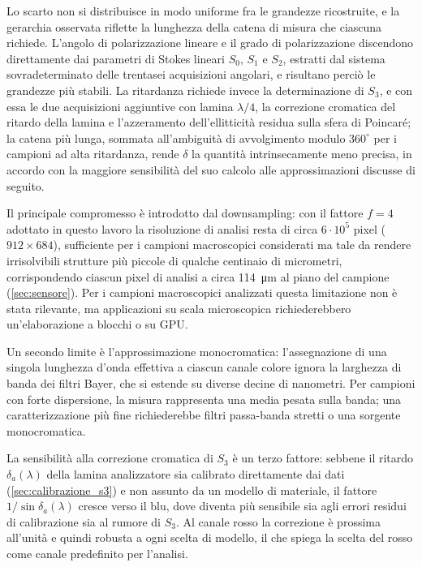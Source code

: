 Lo scarto non si distribuisce in modo uniforme fra le grandezze ricostruite, e la gerarchia osservata riflette la lunghezza della catena di misura che ciascuna richiede. L'angolo di polarizzazione lineare e il grado di polarizzazione discendono direttamente dai parametri di Stokes lineari $S_0$, $S_1$ e $S_2$, estratti dal sistema sovradeterminato delle trentasei acquisizioni angolari, e risultano perciò le grandezze più stabili. La ritardanza richiede invece la determinazione di $S_3$, e con essa le due acquisizioni aggiuntive con lamina $\lambda/4$, la correzione cromatica del ritardo della lamina e l'azzeramento dell'ellitticità residua sulla sfera di Poincaré; la catena più lunga, sommata all'ambiguità di avvolgimento modulo $360^\circ$ per i campioni ad alta ritardanza, rende $\delta$ la quantità intrinsecamente meno precisa, in accordo con la maggiore sensibilità del suo calcolo alle approssimazioni discusse di seguito.

Il principale compromesso è introdotto dal downsampling: con il fattore $f = 4$ adottato in questo lavoro la risoluzione di analisi resta di circa $6 \cdot 10^5$ pixel ($912 \times 684$), sufficiente per i campioni macroscopici considerati ma tale da rendere irrisolvibili strutture più piccole di qualche centinaio di micrometri, corrispondendo ciascun pixel di analisi a circa \SI{114}{\micro\meter} al piano del campione (\cref{sec:sensore}). Per i campioni macroscopici analizzati questa limitazione non è stata rilevante, ma applicazioni su scala microscopica richiederebbero un'elaborazione a blocchi o su GPU.

Un secondo limite è l'approssimazione monocromatica: l'assegnazione di una singola lunghezza d'onda effettiva a ciascun canale colore ignora la larghezza di banda dei filtri Bayer, che si estende su diverse decine di nanometri. Per campioni con forte dispersione, la misura rappresenta una media pesata sulla banda; una caratterizzazione più fine richiederebbe filtri passa-banda stretti o una sorgente monocromatica.

La sensibilità alla correzione cromatica di $S_3$ è un terzo fattore: sebbene il ritardo $\delta_a(\lambda)$ della lamina analizzatore sia calibrato direttamente dai dati (\cref{sec:calibrazione_s3}) e non assunto da un modello di materiale, il fattore $1/\sin\delta_a(\lambda)$ cresce verso il blu, dove diventa più sensibile sia agli errori residui di calibrazione sia al rumore di $S_3$. Al canale rosso la correzione è prossima all'unità e quindi robusta a ogni scelta di modello, il che spiega la scelta del rosso come canale predefinito per l'analisi.


